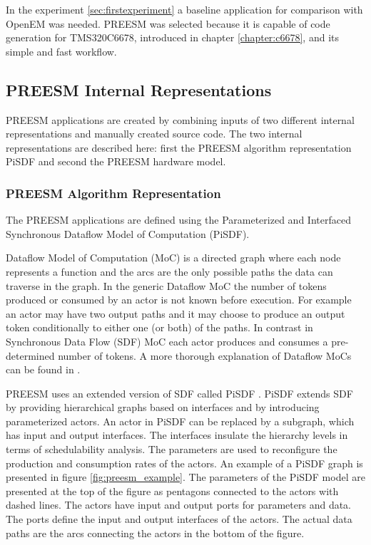In the experiment \ref{sec:firstexperiment} a baseline application for comparison with OpenEM was needed. PREESM was selected because it is capable of code generation for TMS320C6678, introduced in chapter \ref{chapter:c6678}, and its simple and fast workflow.

\subsection{PREESM Internal Representations}
\label{sec:dataflow}
PREESM applications are created by combining inputs of two different internal representations and manually created source code. The two internal representations are described here: first the PREESM algorithm representation PiSDF and second the PREESM hardware model.

\subsubsection{PREESM Algorithm Representation}
The PREESM applications are defined using the Parameterized and Interfaced Synchronous Dataflow Model of Computation (PiSDF)\cite{pelcat2014preesm}. 

Dataflow Model of Computation (MoC) is a directed graph where each node represents a function and the arcs are the only possible paths the data can traverse in the graph. In the generic Dataflow MoC the number of tokens produced or consumed by an actor is not known before execution. For example an actor may have two output paths and it may choose to produce an output token conditionally to either one (or both) of the paths. In contrast in Synchronous Data Flow (SDF) MoC each actor produces and consumes a pre-determined number of tokens. \cite{lee1987synchronous} A more thorough explanation of Dataflow MoCs can be found in \cite{lee2015introduction}.

PREESM uses an extended version of SDF called PiSDF \cite{pelcat2014preesm}. PiSDF extends SDF by providing hierarchical graphs based on interfaces and by introducing parameterized actors. An actor in PiSDF can be replaced by a subgraph, which has input and output interfaces. The interfaces insulate the hierarchy levels in terms of schedulability analysis. The parameters are used to reconfigure the production and consumption rates of the actors. \cite{desnos2013pimm} An example of a PiSDF graph is presented in figure \ref{fig:preesm_example}. The parameters of the PiSDF model are presented at the top of the figure as pentagons connected to the actors with dashed lines. The actors have input and output ports for parameters and data. The ports define the input and output interfaces of the actors. The actual data paths are the arcs connecting the actors in the bottom of the figure.

